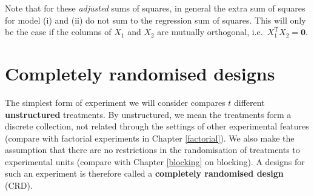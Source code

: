 \documentclass[
]{book}
\theoremstyle{definition}
\theoremstyle{definition}
\theoremstyle{definition}
\theoremstyle{definition}
\theoremstyle{remark}
\begin{document}
Note that for these \emph{adjusted} sums of squares, in general the extra sum of squares for model (i) and (ii) do not sum to the regression sum of squares. This will only be the case if the columns of \(X_1\) and \(X_2\) are mutually orthogonal, i.e.~\(X_1^{\mathrm{T}}X_2 = \boldsymbol{0}\).

\hypertarget{crd}{%
\chapter{Completely randomised designs}\label{crd}}

The simplest form of experiment we will consider compares \(t\) different \textbf{unstructured} treatments. By unstructured, we mean the treatments form a discrete collection, not related through the settings of other experimental features (compare with factorial experiments in Chapter \ref{factorial}). We also make the assumption that there are no restrictions in the randomisation of treatments to experimental units (compare with Chapter \ref{blocking} on blocking). A designs for such an experiment is therefore called a \textbf{completely randomised design} (CRD).
\end{document}
